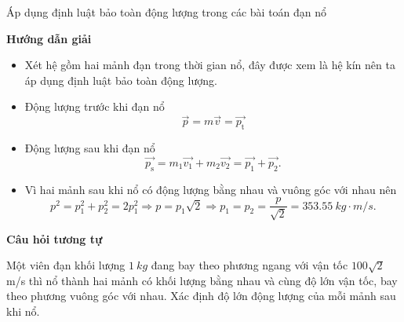\begin{dang}{Áp dụng định luật bảo toàn động lượng trong các bài toán đạn nổ}
	{\begin{center}
			\textbf{Hướng dẫn giải}
		\end{center}
		
		\begin{itemize}
			\item Xét hệ gồm hai mảnh đạn trong thời gian nổ, đây được xem là hệ kín nên ta áp dụng định luật bảo toàn động lượng.
			\item Động lượng trước khi đạn nổ
			\begin{equation*}
				\vec{p}=m\vec{v} =\vec{p_{\text{t}}} 
			\end{equation*}
			\item Động lượng sau khi đạn nổ
			\begin{equation*}
				\vec{p_{\text{s}}}=m_1\vec{v_1}+m_2 \vec{v_2} =\vec{p_1} + \vec{p_2}. 
			\end{equation*}
			\item Vì hai mảnh sau khi nổ có động lượng bằng nhau và vuông góc với nhau nên
			\begin{equation*}
				p^2= p_1^2 + p_2^2 = 2p_1^2 \Rightarrow p = p_1 \sqrt{2} \Rightarrow p_1=p_2=\dfrac{p}{\sqrt{2}}=\SI{353.55}{kg \cdot m/s}.
			\end{equation*}
			
		\end{itemize}
		
		\begin{center}
			\textbf{Câu hỏi tương tự}
		\end{center}
		
		Một viên đạn khối lượng $\SI{1}{kg}$ đang bay theo phương ngang với vận tốc $100\sqrt 2$ m/s thì nổ thành hai mảnh có khối lượng bằng nhau và cùng độ lớn vận tốc, bay theo phương vuông góc với nhau. Xác định độ lớn động lượng của mỗi mảnh sau khi nổ.
		
}
\end{dang}
